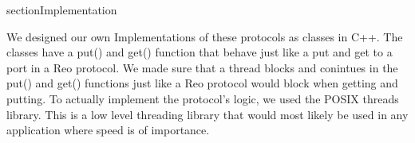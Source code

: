 section{Implementation}

We designed our own Implementations of these protocols as classes in C++. The classes have a put() and get() function that behave just like a put and get to a port in a Reo protocol. We made sure that a thread blocks and conintues in the put() and get() functions just like a Reo protocol would block when getting and putting. To actually implement the protocol's logic, we used the POSIX threads library. This is a low level threading library that would most likely be used in any application where speed is of importance.
